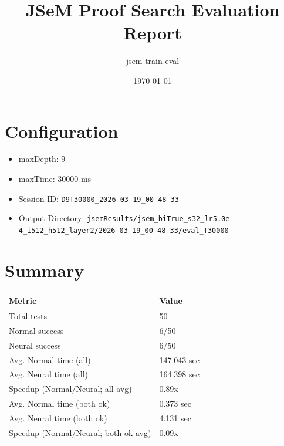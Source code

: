 \documentclass[a4paper,10pt]{article}
\title{JSeM Proof Search Evaluation Report}
\author{jsem-train-eval}
\date{\today}
\begin{document}
\maketitle

\section{Configuration}
\begin{itemize}
\item maxDepth: 9
\item maxTime: 30000 ms
\item Session ID: \texttt{D9T30000\_2026-03-19\_00-48-33}
\item Output Directory: \texttt{jsemResults/jsem\_biTrue\_s32\_lr5.0e-4\_i512\_h512\_layer2/2026-03-19\_00-48-33/eval\_T30000}
\end{itemize}

\section{Summary}
\begin{tabular}{ll}
\toprule
\textbf{Metric} & \textbf{Value} \\
\midrule
Total tests & 50 \\
Normal success & 6/50 \\
Neural success & 6/50 \\
\midrule
Avg. Normal time (all) & 147.043 sec \\
Avg. Neural time (all) & 164.398 sec \\
Speedup (Normal/Neural; all avg) & 0.89x \\
Avg. Normal time (both ok) & 0.373 sec \\
Avg. Neural time (both ok) & 4.131 sec \\
Speedup (Normal/Neural; both ok avg) & 0.09x \\
\bottomrule
\end{tabular}
\end{document}
